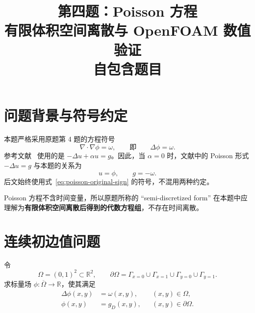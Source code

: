 \documentclass[11pt,a4paper]{ctexart}
\title{第四题：Poisson 方程\\
有限体积空间离散与 OpenFOAM 数值验证\\
\large 自包含题目}
\author{}
\date{}
\newcommand{\R}{\mathbb{R}}
\begin{document}
\maketitle

\section{问题背景与符号约定}

本题严格采用原题第 4 题的方程符号
\begin{equation}
  \nabla\cdot\nabla\phi=\omega,
  \qquad\text{即}\qquad
  \Delta\phi=\omega.
  \label{eq:poisson-original-sign}
\end{equation}
参考文献~\cite{FerrerWillden2011} 使用的是
$-\Delta u+\alpha u=g$。因此，当 $\alpha=0$ 时，文献中的 Poisson
形式 $-\Delta u=g$ 与本题的关系为
\begin{equation}
  u=\phi,
  \qquad g=-\omega.
  \label{eq:sign-map}
\end{equation}
后文始终使用式~\eqref{eq:poisson-original-sign} 的符号，不混用两种约定。

Poisson 方程不含时间变量，所以原题所称的 ``semi-discretized form''
在本题中应理解为\textbf{有限体积空间离散后得到的代数方程组}，不存在时间离散。

\section{连续初边值问题}

令
\begin{equation}
  \Omega=(0,1)^2\subset\R^2,
  \qquad
  \partial\Omega=\Gamma_{x=0}\cup\Gamma_{x=1}
  \cup\Gamma_{y=0}\cup\Gamma_{y=1}.
\end{equation}
求标量场 $\phi:\overline\Omega\to\R$，使其满足
\begin{subequations}\label{eq:strong-problem}
\begin{align}
  \Delta\phi(x,y)&=\omega(x,y),
  &&(x,y)\in\Omega,\label{eq:strong-pde}\\
  \phi(x,y)&=g_D(x,y),
  &&(x,y)\in\partial\Omega.\label{eq:strong-bc}
\end{align}
\end{subequations}
\end{document}
